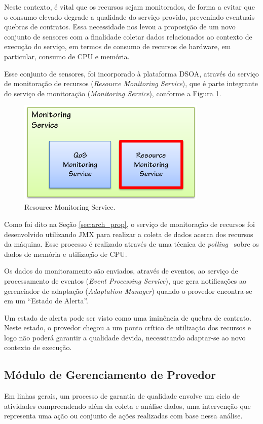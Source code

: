 Neste contexto, é vital que os recursos sejam monitorados, de forma a evitar que o consumo elevado degrade a qualidade do serviço provido, prevenindo eventuais quebras de contratos. Essa necessidade nos levou a proposição de um novo conjunto de sensores com a finalidade coletar dados relacionados ao contexto de execução do serviço, em termos de consumo de recursos de hardware, em particular, consumo de CPU e memória. 

Esse conjunto de sensores, foi incorporado à plataforma DSOA, através do serviço de monitoração de recursos (\textit{Resource Monitoring Service}), que é parte integrante do serviço de monitoração (\textit{Monitoring Service}), conforme a Figura \ref{fig:resc_module}.

\begin{figure}[htp]
\centering
\includegraphics[width=9cm]{chapters/chapter4/monitoring-service.png}
\caption[Resource Monitoring Service]{Resource Monitoring Service.}
\label{fig:resc_module}
\end{figure}

Como foi dito na Seção \ref{sec:arch_prop}, o serviço de monitoração de recursos foi desenvolvido utilizando JMX para realizar a coleta de dados acerca dos recursos da máquina. Esse processo é realizado através de uma técnica de \textit{polling}~\cite{patterson2005organizacao} sobre os dados de memória e utilização de CPU.

Os dados do monitoramento são enviados, através de eventos, ao serviço de processamento de eventos (\textit{Event Processing Service}), que gera notificações ao gerenciador de adaptação (\textit{Adaptation Manager}) quando o provedor encontra-se em um ``Estado de Alerta''.

Um estado de alerta pode ser visto como uma iminência de quebra de contrato. Neste estado, o provedor chegou a um ponto crítico de utilização dos recursos e logo não poderá garantir a qualidade devida, necessitando adaptar-se ao novo contexto de execução.

\subsection{Módulo de Gerenciamento de Provedor}
\label{subsec:qos_provider}
Em linhas gerais, um processo de garantia de qualidade envolve um ciclo de atividades compreendendo além da coleta e análise dados, uma intervenção que representa uma ação ou conjunto de ações realizadas com base nessa análise. 

